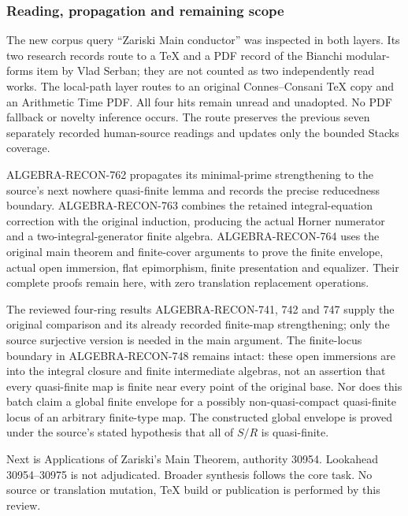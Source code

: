 \subsubsection{Reading, propagation and remaining scope}\label{reading-propagation-and-remaining-scope}

The new corpus query ``Zariski Main conductor'' was inspected in both layers. Its two research records route to a TeX and a PDF record of the Bianchi modular-forms item by Vlad Serban; they are not counted as two independently read works. The local-path layer routes to an original Connes--Consani TeX copy and an Arithmetic Time PDF. All four hits remain unread and unadopted. No PDF fallback or novelty inference occurs. The route preserves the previous seven separately recorded human-source readings and updates only the bounded Stacks coverage.

ALGEBRA-RECON-762 propagates its minimal-prime strengthening to the source's next nowhere quasi-finite lemma and records the precise reducedness boundary. ALGEBRA-RECON-763 combines the retained integral-equation correction with the original induction, producing the actual Horner numerator and a two-integral-generator finite algebra. ALGEBRA-RECON-764 uses the original main theorem and finite-cover arguments to prove the finite envelope, actual open immersion, flat epimorphism, finite presentation and equalizer. Their complete proofs remain here, with zero translation replacement operations.

The reviewed four-ring results ALGEBRA-RECON-741, 742 and 747 supply the original comparison and its already recorded finite-map strengthening; only the source surjective version is needed in the main argument. The finite-locus boundary in ALGEBRA-RECON-748 remains intact: these open immersions are into the integral closure and finite intermediate algebras, not an assertion that every quasi-finite map is finite near every point of the original base. Nor does this batch claim a global finite envelope for a possibly non-quasi-compact quasi-finite locus of an arbitrary finite-type map. The constructed global envelope is proved under the source's stated hypothesis that all of \(S/R\) is quasi-finite.

Next is Applications of Zariski's Main Theorem, authority 30954. Lookahead 30954--30975 is not adjudicated. Broader synthesis follows the core task. No source or translation mutation, TeX build or publication is performed by this review.
